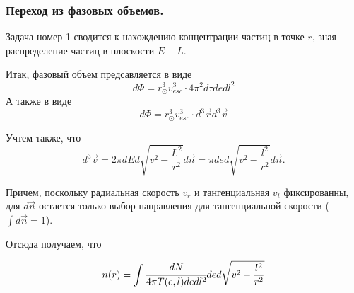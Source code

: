 	
	\subsubsection{Переход из фазовых объемов.}
	Задача номер 1 сводится к нахождению концентрации частиц в точке $r$, зная распределение частиц в плоскости $E-L$.
	
	Итак, фазовый объем предсавляется в виде
	\begin{equation}
		\label{eq:phase_volume_nd}
		d\Phi = r_{\odot}^3v_{esc}^3 \cdot 4\pi^{2} d\tau de dl^2
	\end{equation}
	А также в виде
	\begin{equation}
		d\Phi = r_{\odot}^3v_{esc}^3 \cdot d^3\vec{r}d^3\vec{v}
	\end{equation}
	
	Учтем также, что
	\begin{equation}
		\label{eq:velocity_dens}
		d^{3}\vec{v} = 
		2\pi dEd\sqrt{v^2-\frac{L^2}{r^2}} d\vec{n} = \pi ded\sqrt{v^2-\frac{l^2}{r^2}} d\vec{n}.
	\end{equation}
	 
	 Причем, поскольку радиальная скорость $v_r$ и тангенциальная $v_{t}$ фиксированны, для $d\vec{n}$ остается только выбор направления для тангенциальной скорости ($\int{d\vec{n}} = 1$).
	 
	 Отсюда получаем, что
	 
	 \begin{equation}
	 	n(r) = \int{ \cfrac{dN}{4\pi T(e,l) de dl^2} de d\sqrt{v^2-\frac{l^2}{r^2}}}
	 \end{equation}
	 
